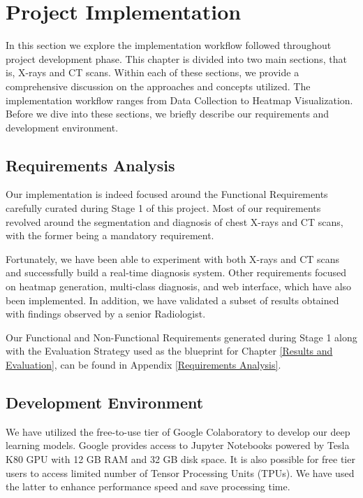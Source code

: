 \chapter{Project Implementation} \label{Project Implementation}

In this section we explore the implementation workflow followed throughout project development phase. This chapter is divided into two main sections, that is, X-rays and CT scans. Within each of these sections, we provide a comprehensive discussion on the approaches and concepts utilized. The implementation workflow ranges from Data Collection to Heatmap Visualization. Before we dive into these sections, we briefly describe our requirements and development environment. 

\section{Requirements Analysis}

Our implementation is indeed focused around the Functional Requirements carefully curated during Stage 1 of this project. Most of our requirements revolved around the segmentation and diagnosis of chest X-rays and CT scans, with the former being a mandatory requirement. 

Fortunately, we have been able to experiment with both X-rays and CT scans and successfully build a real-time diagnosis system. Other requirements focused on heatmap generation, multi-class diagnosis, and web interface, which have also been implemented. In addition, we have validated a subset of results obtained with findings observed by a senior Radiologist. 

Our Functional and Non-Functional Requirements generated during Stage 1 along with the Evaluation Strategy used as the blueprint for Chapter \ref{Results and Evaluation}, can be found in Appendix \ref{Requirements Analysis}.


\section{Development Environment} \label{devEnv}
We have utilized the free-to-use tier of Google Colaboratory to develop our deep learning models. Google provides access to Jupyter Notebooks powered by Tesla K80 GPU with 12 GB RAM and 32 GB disk space. It is also possible for free tier users to access limited number of Tensor Processing Units (TPUs). We have used the latter to enhance performance speed and save processing time.

